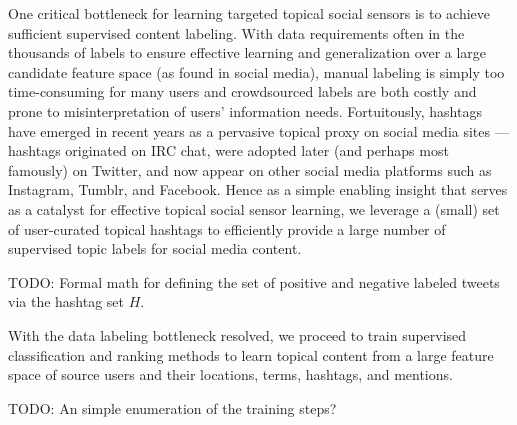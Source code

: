 One critical bottleneck for learning targeted topical social sensors
is to achieve sufficient supervised content labeling.  With data
requirements often in the thousands of labels to ensure effective
learning and generalization over a large candidate feature space (as
found in social media), manual labeling is simply too time-consuming
for many users and crowdsourced labels are both costly and prone to
misinterpretation of users' information needs.  Fortuitously, hashtags
have emerged in recent years as a pervasive topical proxy on social
media sites --- hashtags originated on IRC chat, were adopted later
(and perhaps most famously) on Twitter, and now appear on other social
media platforms such as Instagram, Tumblr, and Facebook.  Hence as a
simple enabling insight that serves as a catalyst for effective
topical social sensor learning, we leverage a (small) set of
user-curated topical hashtags to efficiently provide a large number of
supervised topic labels for social media content.

TODO: Formal math for defining the set of positive and negative labeled
tweets via the hashtag set $H$.

With the data labeling bottleneck resolved, we proceed to train
supervised classification and ranking methods to learn topical content
from a large feature space of source users and their locations, terms,
hashtags, and mentions.

TODO: An simple enumeration of the training steps?

